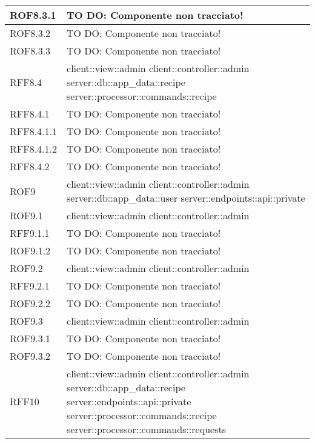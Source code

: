 \begin{center}
\begin{longtable}{| p{4cm} | p{8cm} |}
\hline
ROF8.3.1 & TO DO: Componente non tracciato! \\
\hline
ROF8.3.2 & TO DO: Componente non tracciato! \\
\hline
ROF8.3.3 & TO DO: Componente non tracciato! \\
\hline
RFF8.4 & client::view::admin \newline client::controller::admin \newline server::db::app\_data::recipe \newline server::processor::commands::recipe \\
\hline
RFF8.4.1 & TO DO: Componente non tracciato! \\
\hline
RFF8.4.1.1 & TO DO: Componente non tracciato! \\
\hline
RFF8.4.1.2 & TO DO: Componente non tracciato! \\
\hline
RFF8.4.2 & TO DO: Componente non tracciato! \\
\hline
ROF9 & client::view::admin \newline client::controller::admin \newline server::db::app\_data::user \newline server::endpoints::api::private \\
\hline
ROF9.1 & client::view::admin \newline client::controller::admin \\
\hline
RFF9.1.1 & TO DO: Componente non tracciato! \\
\hline
ROF9.1.2 & TO DO: Componente non tracciato! \\
\hline
ROF9.2 & client::view::admin \newline client::controller::admin \\
\hline
RFF9.2.1 & TO DO: Componente non tracciato! \\
\hline
ROF9.2.2 & TO DO: Componente non tracciato! \\
\hline
ROF9.3 & client::view::admin \newline client::controller::admin \\
\hline
ROF9.3.1 & TO DO: Componente non tracciato! \\
\hline
ROF9.3.2 & TO DO: Componente non tracciato! \\
\hline
RFF10 & client::view::admin \newline client::controller::admin \newline server::db::app\_data::recipe \newline server::endpoints::api::private \newline server::processor::commands::recipe \newline server::processor::commands::requests \\

\end{longtable}
\end{center}
